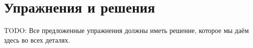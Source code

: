 \chapter{Упражнения и решения}

TODO: Все предложенные упражнения должны иметь решение, которое мы даём здесь во всех деталях. 